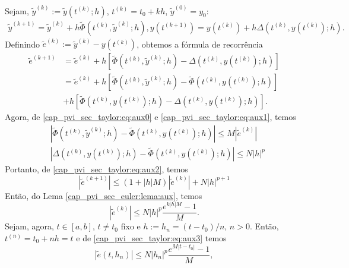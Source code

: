\begin{dem}
  Sejam, $\tilde{y}^{(k)} := \tilde{y}\left(t^{(k)}; h\right)$, $t^{(k)} = t_0 + kh$, $\tilde{y}^{(0)} = y_0$:
  \begin{align}
    \tilde{y}^{(k+1)} = \tilde{y}^{(k)} + h\tilde{\Phi}\left(t^{(k)}, \tilde{y}^{(k)}; h\right),
    y\left(t^{(k+1)}\right) = y\left(t^{(k)}\right) + h\Delta\left(t^{(k)}, y\left(t^{(k)}\right); h\right).
  \end{align}
  Definindo $\tilde{e}^{(k)} := \tilde{y}^{(k)} - y\left(t^{(k)}\right)$, obtemos a fórmula de recorrência
  \begin{align}
    \tilde{e}^{(k+1)} &= \tilde{e}^{(k)} + h\left[\tilde{\Phi}\left(t^{(k)}, \tilde{y}^{(k)}; h\right) - \Delta\left(t^{(k)}, y\left(t^{(k)}\right); h\right)\right]\\
                      &= \tilde{e}^{(k)} + h\left[\tilde{\Phi}\left(t^{(k)}, \tilde{y}^{(k)}; h\right) - \tilde{\Phi}\left(t^{(k)}, y\left(t^{(k)}\right); h\right)\right]\\
                      &+ h\left[\tilde{\Phi}\left(t^{(k)}, y\left(t^{(k)}\right); h\right) - \Delta\left(t^{(k)}, y\left(t^{(k)}\right); h\right)\right].\label{cap_pvi_sec_taylor:eq:aux2}
  \end{align}
  Agora, de \eqref{cap_pvi_sec_taylor:eq:aux0} e \eqref{cap_pvi_sec_taylor:eq:aux1}, temos
  \begin{align}
    &\left|\tilde{\Phi}\left(t^{(k)}, \tilde{y}^{(k)}; h\right) - \tilde{\Phi}\left(t^{(k)}, y\left(t^{(k)}\right); h\right)\right| \leq M\left|\tilde{e}^{(k)}\right|\\
    &\left|\Delta\left(t^{(k)}, y\left(t^{(k)}\right); h\right) - \tilde{\Phi}\left(t^{(k)}, y\left(t^{(k)}\right); h\right)\right| \leq N |h|^p
  \end{align}
  Portanto, de \eqref{cap_pvi_sec_taylor:eq:aux2}, temos
  \begin{equation}
    \left|\tilde{e}^{(k+1)}\right| \leq \left(1 + |h|M\right)\left|\tilde{e}^{(k)}\right| + N |h|^{p+1}
  \end{equation}
  Então, do Lema \ref{cap_pvi_sec_euler:lema:aux}, temos
  \begin{equation}\label{cap_pvi_sec_taylor:eq:aux3}
    \left|\tilde{e}^{(k)}\right| \leq N|h|^p\frac{e^{k|h|M}-1}{M}.
  \end{equation}
  Sejam, agora, $t\in [a, b]$, $t\neq t_0$ fixo e $h := h_n = (t-t_0)/n$, $n>0$. Então, $t^{(n)} = t_0 + nh = t$ e de \eqref{cap_pvi_sec_taylor:eq:aux3} temos
  \begin{equation}
    \left|\tilde{e}\left(t, h_n\right)\right| \leq N|h_n|^p\frac{e^{M|t-t_0|}-1}{M},

\end{equation}
\end{dem}
